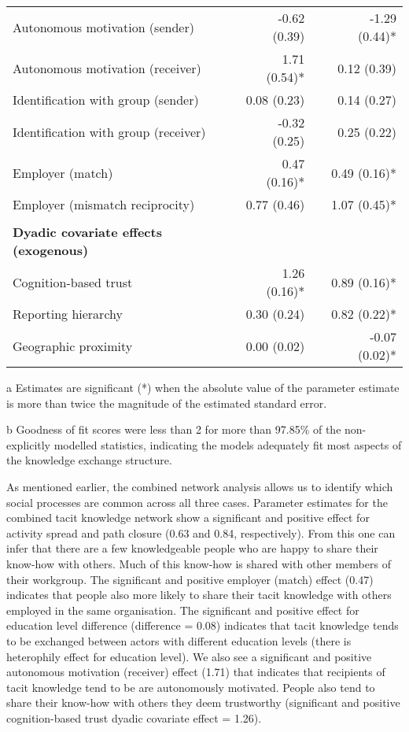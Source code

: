 \begin{table}[]
{\begin{threeparttable}
\begin{tabular}{@{}lrlr@{}}
Autonomous motivation (sender) & -0.62 (0.39)\phantom{*} &  & -1.29 (0.44)* \\
Autonomous motivation (receiver) & 1.71 (0.54)* &  & 0.12 (0.39)\phantom{*} \\
Identification with group (sender) & 0.08 (0.23)\phantom{*} &  & 0.14 (0.27)\phantom{*} \\
Identification with group (receiver) & -0.32 (0.25)\phantom{*} &  & 0.25 (0.22)\phantom{*} \\
Employer (match) & 0.47 (0.16)* &  & 0.49 (0.16)* \\
Employer (mismatch reciprocity) & 0.77 (0.46)\phantom{*} &  & 1.07 (0.45)* \\
 &  &  &  \\
\textbf{Dyadic covariate effects (exogenous)} &  &  &  \\
Cognition-based trust & 1.26 (0.16)* &  & 0.89 (0.16)* \\
Reporting hierarchy & 0.30 (0.24)\phantom{*} &  & 0.82 (0.22)* \\
Geographic proximity & 0.00 (0.02)\phantom{*} &  & -0.07 (0.02)* \\ \bottomrule
\end{tabular}
\begin{tablenotes}
\footnotesize
\item[a] Estimates are significant (*) when the absolute value of the parameter estimate is more than twice the magnitude of the estimated standard error.
\item[b] Goodness of fit scores were less than 2 for more than 97.85\% of the non-explicitly modelled statistics, indicating the models adequately fit most aspects of the knowledge exchange structure.
\end{tablenotes}
\end{threeparttable}
}
\end{table}

As mentioned earlier, the combined network analysis allows us to identify which social processes are common across all three cases. Parameter estimates for the combined tacit knowledge network show a significant and positive effect for activity spread and path closure (0.63 and 0.84, respectively). From this one can infer that there are a few knowledgeable people who are happy to share their know-how with others. Much of this know-how is shared with other members of their workgroup. The significant and positive employer (match) effect (0.47) indicates that people also more likely to share their tacit knowledge with others employed in the same organisation. The significant and positive effect for education level difference (difference = 0.08) indicates that tacit knowledge tends to be exchanged between actors with different education levels (there is heterophily effect for education level). We also see a significant and positive autonomous motivation (receiver) effect (1.71) that indicates that recipients of tacit knowledge tend to be are autonomously motivated.  People also tend to share their know-how with others they deem trustworthy (significant and positive cognition-based trust dyadic covariate effect = 1.26). \medskip

